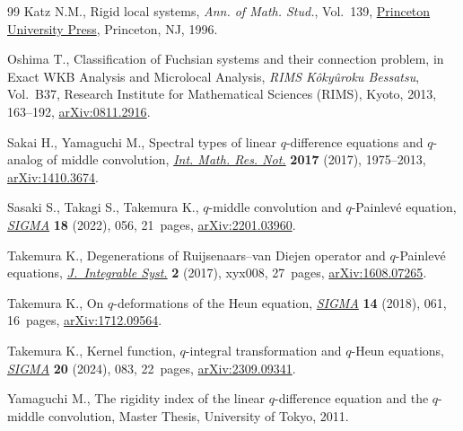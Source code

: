 \documentclass[pdftex]{sigma}
\numberwithin{equation}{section}
\theoremstyle{definition}
\begin{document}
\begin{thebibliography}{99}
Katz N.M., Rigid local systems, \textit{Ann. of Math. Stud.}, Vol.~139,
 \href{https://doi.org/10.1515/9781400882595}{Princeton University Press},
 Princeton, NJ, 1996.

Oshima T., Classification of {F}uchsian systems and their connection problem,
 in Exact {WKB} {A}nalysis and {M}icrolocal {A}nalysis, \textit{RIMS K\^{o}ky\^{u}roku
 Bessatsu}, Vol.~B37, Research Institute for Mathematical Sciences (RIMS), Kyoto,
 2013, 163--192, \href{http://arxiv.org/abs/0811.2916}{arXiv:0811.2916}.

Sakai H., Yamaguchi M., Spectral types of linear {$q$}-difference equations and
 {$q$}-analog of middle convolution,
 \href{https://doi.org/10.1093/imrn/rnw089}{\textit{Int. Math. Res. Not.}}
 \textbf{2017} (2017), 1975--2013,
 \href{http://arxiv.org/abs/1410.3674}{arXiv:1410.3674}.

Sasaki S., Takagi S., Takemura K., {$q$}-middle convolution and
 {$q$}-{P}ainlev\'e equation,
 \href{https://doi.org/10.3842/SIGMA.2022.056}{\textit{SIGMA}} \textbf{18}
 (2022), 056, 21~pages,
 \href{http://arxiv.org/abs/2201.03960}{arXiv:2201.03960}.

Takemura K., Degenerations of {R}uijsenaars--van {D}iejen operator and
 {$q$}-{P}ainlev\'e equations,
 \href{https://doi.org/10.1093/integr/xyx008}{\textit{J.~Integrable Syst.}}
 \textbf{2} (2017), xyx008, 27~pages,
 \href{http://arxiv.org/abs/1608.07265}{arXiv:1608.07265}.

Takemura K., On {$q$}-deformations of the {H}eun equation,
 \href{https://doi.org/10.3842/SIGMA.2018.061}{\textit{SIGMA}} \textbf{14}
 (2018), 061, 16~pages,
 \href{http://arxiv.org/abs/1712.09564}{arXiv:1712.09564}.

Takemura K., Kernel function, {$q$}-integral transformation and {$q$}-{H}eun
 equations, \href{https://doi.org/10.3842/SIGMA.2024.083}{\textit{SIGMA}}
 \textbf{20} (2024), 083, 22~pages,
 \href{http://arxiv.org/abs/2309.09341}{arXiv:2309.09341}.

Yamaguchi M., The rigidity index of the linear $q$-difference equation and the
 $q$-middle convolution, {M}aster Thesis, {U}niversity of Tokyo, 2011.

\end{thebibliography}\LastPageEnding
\end{document}
